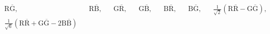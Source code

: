 \documentclass{article}
\begin{document}
\begin{align}
  \text{R}\overline{\text{G}}, && \text{R}\overline{\text{B}}, && \text{G}\overline{\text{R}}, && \text{G}\overline{\text{B}}, && \text{B}\overline{\text{R}}, && \text{B}\overline{\text{G}}, && \frac{1}{\sqrt{2}}\left(\text{R}\overline{\text{R}}-\text{G}\overline{\text{G}}\right), &&
  \\\frac{1}{\sqrt{6}}\left(\text{R}\overline{\text{R}}+\text{G}\overline{\text{G}}-2\text{B}\overline{\text{B}}\right)
\end{align}
\end{document}
